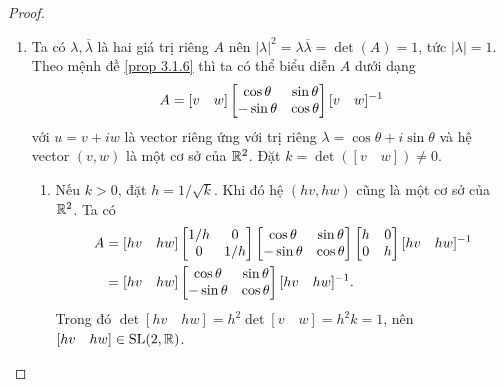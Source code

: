 \begin{proof}
\begin{enumerate}
        \item Ta có $\lambda, \overline{\lambda}$ là hai giá trị riêng $A$ nên $|\lambda|^2 = \lambda \overline{\lambda} = \det(A) = 1$, tức $|\lambda| = 1$.
        Theo mệnh đề \ref{prop 3.1.6} thì ta có thể biểu diễn $A$ dưới dạng
        \[A = [v \quad w]\begin{bmatrix} \cos{\theta} & \sin{\theta}\\ -\sin{\theta} & \cos{\theta} \end{bmatrix}[v \quad w]^{-1}\]
    với $u = v + iw $ là vector riêng ứng với trị riêng $\lambda = \cos\theta +i\sin\theta$ và hệ vector $(v,w)$ là một cơ sở của $\mathbb{R}^2$.
    Đặt $k = \det([v\quad w]) \neq 0$. 
    \begin{enumerate}
        \item Nếu $k>0$, đặt $h =1/\sqrt{k}$. Khi đó hệ $(hv,hw)$ cũng là một cơ sở của $\mathbb{R}^2$. Ta có
        \begin{align*}
            A &= [hv \quad hw] \begin{bmatrix}
        1/h & 0\\
        0 & 1/h
        \end{bmatrix}
        \begin{bmatrix} \cos{\theta} & \sin{\theta}\\ -\sin{\theta} & \cos{\theta} \end{bmatrix}\begin{bmatrix}
        h & 0\\
        0 & h
        \end{bmatrix}[hv \quad hw]^{-1}\\
        &= [hv \quad hw]\begin{bmatrix} \cos{\theta} & \sin{\theta}\\ -\sin{\theta} & \cos{\theta} \end{bmatrix}[hv \quad hw]^{-1}.
    \end{align*}
    Trong đó $\det[hv \quad hw] = h^2\det[v\quad w]= h^2k = 1$, nên $[hv\quad hw]\in \operatorname{SL}(2,\mathbb{R})$. 


\end{enumerate}
\end{enumerate}
\end{proof}
